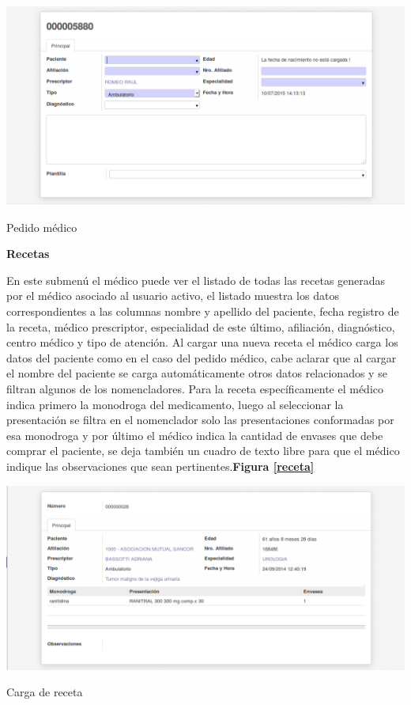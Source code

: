 \begin{correccionFigure}[h]
      \centering
      \includegraphics[width=.8\textwidth]{img/tp1/HE/PedidoMedico}
      \caption{Pedido médico}
      \label{pedido-medico}
\end{correccionFigure}


\textbf{Recetas}

En este submenú el médico puede ver el listado de todas las recetas generadas por el médico asociado al usuario activo, el listado muestra los datos correspondientes a las columnas nombre y apellido del paciente, fecha registro de la receta, médico prescriptor, especialidad de este último, afiliación, diagnóstico, centro médico y tipo de atención. Al cargar una nueva receta el médico carga los datos del paciente como en el caso del pedido médico, cabe aclarar que al cargar el nombre del paciente se carga automáticamente otros datos relacionados y se filtran algunos de los nomencladores. Para la receta específicamente el médico indica primero la monodroga del medicamento, luego al seleccionar la presentación se filtra en el nomenclador solo las presentaciones conformadas por esa monodroga y por último el médico indica la cantidad de envases que debe comprar el paciente, se deja también un cuadro de texto libre para que el médico indique las observaciones que sean pertinentes.\textbf{Figura \ref{receta}}

\begin{correccionFigure}
      \centering
      \includegraphics[width=.8\textwidth]{img/tp1/HE/Receta}
      \caption{Carga de receta}
      \label{receta}
\end{correccionFigure}


